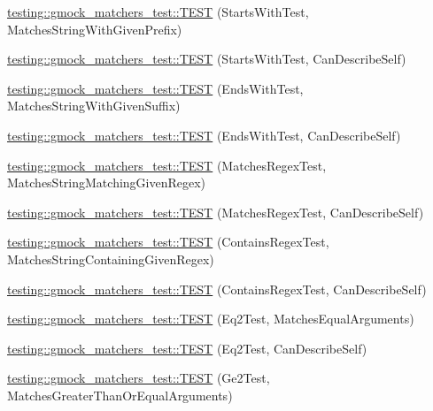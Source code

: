 \begin{DoxyCompactItemize}
\mbox{\hyperlink{namespacetesting_1_1gmock__matchers__test_ac8a66c592ff57cce28b6f1d5211fd370}{testing\+::gmock\+\_\+matchers\+\_\+test\+::\+T\+E\+ST}} (Starts\+With\+Test, Matches\+String\+With\+Given\+Prefix)
\item 
\mbox{\hyperlink{namespacetesting_1_1gmock__matchers__test_a492143bbe0627c563c5d0c65bf3f4d5b}{testing\+::gmock\+\_\+matchers\+\_\+test\+::\+T\+E\+ST}} (Starts\+With\+Test, Can\+Describe\+Self)
\item 
\mbox{\hyperlink{namespacetesting_1_1gmock__matchers__test_ac3d41540d2ae7956d33c9eae1be67d91}{testing\+::gmock\+\_\+matchers\+\_\+test\+::\+T\+E\+ST}} (Ends\+With\+Test, Matches\+String\+With\+Given\+Suffix)
\item 
\mbox{\hyperlink{namespacetesting_1_1gmock__matchers__test_a80da065ed9f5fb87add88ae2bc14056d}{testing\+::gmock\+\_\+matchers\+\_\+test\+::\+T\+E\+ST}} (Ends\+With\+Test, Can\+Describe\+Self)
\item 
\mbox{\hyperlink{namespacetesting_1_1gmock__matchers__test_a5983e981b59498c6427ddb183c414bb7}{testing\+::gmock\+\_\+matchers\+\_\+test\+::\+T\+E\+ST}} (Matches\+Regex\+Test, Matches\+String\+Matching\+Given\+Regex)
\item 
\mbox{\hyperlink{namespacetesting_1_1gmock__matchers__test_acb4e75ec699fe1bc178e7ec32fb479c8}{testing\+::gmock\+\_\+matchers\+\_\+test\+::\+T\+E\+ST}} (Matches\+Regex\+Test, Can\+Describe\+Self)
\item 
\mbox{\hyperlink{namespacetesting_1_1gmock__matchers__test_a0a23f3ff8f97ccf74cd64673edc6694f}{testing\+::gmock\+\_\+matchers\+\_\+test\+::\+T\+E\+ST}} (Contains\+Regex\+Test, Matches\+String\+Containing\+Given\+Regex)
\item 
\mbox{\hyperlink{namespacetesting_1_1gmock__matchers__test_ac3d469a146dec0c6ede2b46ff992c8d7}{testing\+::gmock\+\_\+matchers\+\_\+test\+::\+T\+E\+ST}} (Contains\+Regex\+Test, Can\+Describe\+Self)
\item 
\mbox{\hyperlink{namespacetesting_1_1gmock__matchers__test_a768adf8450910e4c3ac0cb2caec8a4c2}{testing\+::gmock\+\_\+matchers\+\_\+test\+::\+T\+E\+ST}} (Eq2\+Test, Matches\+Equal\+Arguments)
\item 
\mbox{\hyperlink{namespacetesting_1_1gmock__matchers__test_a45da3962b4ae052dd47e1ae1bfd8b762}{testing\+::gmock\+\_\+matchers\+\_\+test\+::\+T\+E\+ST}} (Eq2\+Test, Can\+Describe\+Self)
\item 
\mbox{\hyperlink{namespacetesting_1_1gmock__matchers__test_a100bae52c11f2e44a141652002d3bee2}{testing\+::gmock\+\_\+matchers\+\_\+test\+::\+T\+E\+ST}} (Ge2\+Test, Matches\+Greater\+Than\+Or\+Equal\+Arguments)

\end{DoxyCompactItemize}
